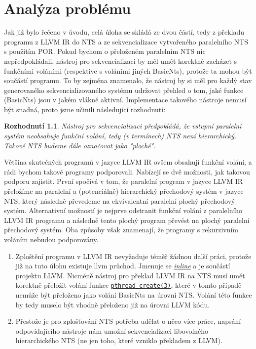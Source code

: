 \documentclass[12pt]{fithesis2}
\newtheorem{decision}  {Rozhodnutí}
\begin{document}
\chapter{Analýza problému}
\label{sec:analysis}
Jak již bylo řečeno v úvodu, celá úloha se skládá ze dvou částí, tedy z překladu programu z LLVM IR do NTS a  ze sekvencializace vytvořeného paralelního NTS s použitím POR. Pokud bychom o přeloženém paralelním NTS nic nepředpokládali, nástroj pro sekvencializaci by měl umět korektně zacházet s funkčními voláními (respektive s voláními jiných BasicNts), protože ta mohou být součástí programu. To by zejména znamenalo, že nástroj by si měl pro každý stav generovaného sekvencializovaného systému udržovat přehled o tom, jaké funkce (BasicNts) jsou v jakém vlákně aktivní. Implementace takového nástroje nemusí být snadná, proto jsme učinili následující rozhodnutí:

\begin{decision}\label{decision:sequentialize-flat-llvm}
Nástroj pro sekvencializaci předpokládá, že vstupní paralelní systém neobsahuje funkční volání, tedy (v termínech) NTS není hierarchický. Takové NTS budeme dále označovat jako "ploché".
\end{decision}

Většina skutečných programů v jazyce LLVM IR ovšem obsahují funkční volání, a rádi bychom takové programy podporovali. Nabízejí se dvě možnosti, jak takovou podporu zajistit. První spočívá v tom, že paralelní program v jazyce LLVM IR přeložíme na paralelní a (potenciálně) hierarchický přechodový systém v jazyce NTS, který následně převedeme na ekvivalentní paralelní plochý přechodový systém. Alternativní možností je nejprve odstranit funkční volání z paralelního LLVM IR programu a následně tento plochý program převést na plochý paralelní přechodový systém. Oba způsoby však znamenají, že programy s rekurzivním voláním nebudou podporovány.

\begin{enumerate}
\item Zploštění programu v LLVM IR nevyžaduje téměř žádnou další práci, protože již na tuto úlohu existuje llvm průchod. Jmenuje se
\href{http://llvm.org/docs/Passes.html#inline-function-integration-inlining}
{\textit{inline}} a je součástí projektu LLVM. Nicméně nástroj pro překlad LLVM IR na NTS musí umět korektně přeložit volání funkce
\href{http://man7.org/linux/man-pages/man3/pthread\_create.3.html}
{\texttt{pthread\_create(3)}}, které v tomto případě nemůže být přeloženo jako volání BasicNts na úrovni NTS. Volání této funkce by tedy muselo být vhodně přeloženo již na úrovni LLVM kódu.

\item Přestože je pro zplošťování NTS potřeba udělat o něco více práce, napsání odpovídajícího nástroje nám umožní sekvencializaci libovolného hierarchického NTS (ne jen toho, které vzniklo překladem z LLVM).
\end{enumerate}
\end{document}
